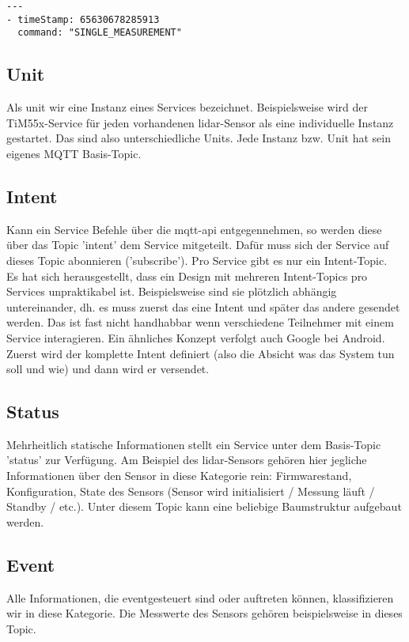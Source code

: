 \begin{lstlisting}[caption={Beispiel einer MQTT-Payload}, label={lst:examplePayload}]
---
- timeStamp: 65630678285913
  command: "SINGLE_MEASUREMENT"
\end{lstlisting}

\subsection{Unit}
Als \gls{unit} wir eine Instanz eines Services bezeichnet. Beispielsweise wird der TiM55x-Service für jeden vorhandenen \acrshort{lidar}-Sensor als eine individuelle Instanz gestartet. Das sind also unterschiedliche Units. Jede Instanz bzw. Unit hat sein eigenes MQTT Basis-Topic.

\subsection{Intent}
Kann ein Service Befehle über die \acrshort{mqtt}-\acrshort{api} entgegennehmen, so werden diese über das Topic '\gls{intent}' dem Service mitgeteilt. Dafür muss sich der Service auf dieses Topic abonnieren ('subscribe'). Pro Service gibt es nur ein Intent-Topic. \\ Es hat sich herausgestellt, dass ein Design mit mehreren Intent-Topics pro Services unpraktikabel ist. Beispielsweise sind sie plötzlich abhängig untereinander, dh. es muss zuerst das eine Intent und später das andere gesendet werden. Das ist fast nicht handhabbar wenn verschiedene Teilnehmer mit einem Service interagieren. Ein ähnliches Konzept verfolgt auch Google bei Android. Zuerst wird der komplette Intent definiert (also die Absicht was das System tun soll und wie) und dann wird er versendet.

\subsection{Status}
Mehrheitlich statische Informationen stellt ein Service unter dem Basis-Topic '\gls{status}' zur Verfügung. Am Beispiel des \acrshort{lidar}-Sensors gehören hier jegliche Informationen über den Sensor in diese Kategorie rein: Firmwarestand, Konfiguration, State des Sensors (Sensor wird initialisiert / Messung läuft / Standby / etc.). Unter diesem Topic kann eine beliebige Baumstruktur aufgebaut werden.

\subsection{Event}
Alle Informationen, die eventgesteuert sind oder auftreten können, klassifizieren wir in diese Kategorie. Die Messwerte des Sensors gehören beispielsweise in dieses Topic.


